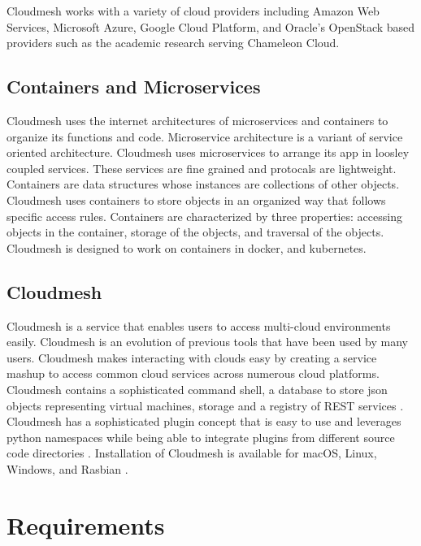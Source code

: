 Cloudmesh works with a variety of cloud providers including Amazon Web
Services, Microsoft Azure, Google Cloud Platform, and Oracle's OpenStack
based providers such as the academic research serving Chameleon Cloud.

\subsection{Containers and Microservices}
\label{containers-and-microservices}

Cloudmesh uses the internet architectures of microservices and
containers to organize its functions and code. Microservice architecture
is a variant of service oriented architecture. Cloudmesh uses
microservices to arrange its app in loosley coupled services. These
services are fine grained and protocals are lightweight. Containers are
data structures whose instances are collections of other objects.
Cloudmesh uses containers to store objects in an organized way that
follows specific access rules. Containers are characterized by three
properties: accessing objects in the container, storage of the objects,
and traversal of the objects. Cloudmesh is designed to work on
containers in docker, and kubernetes.


\subsection{Cloudmesh}\label{cloudmesh}

Cloudmesh \cite{cloudmesh-manual} is a service that enables users to
access multi-cloud environments easily. Cloudmesh is an evolution of
previous tools that have been used by many users. Cloudmesh makes
interacting with clouds easy by creating a service mashup to access
common cloud services across numerous cloud platforms. Cloudmesh
contains a sophisticated command shell, a database to store json
objects representing virtual machines, storage and a registry of REST
services \cite{cloudmesh-openapi}.  Cloudmesh has a sophisticated
plugin concept that is easy to use and leverages python namespaces
while being able to integrate plugins from different source code
directories \cite{cloudmesh-github}.  Installation of Cloudmesh is
available for macOS, Linux, Windows, and Rasbian
\cite{cloudmesh-manual}.



\section{Requirements}
\label{sec:requirements}

